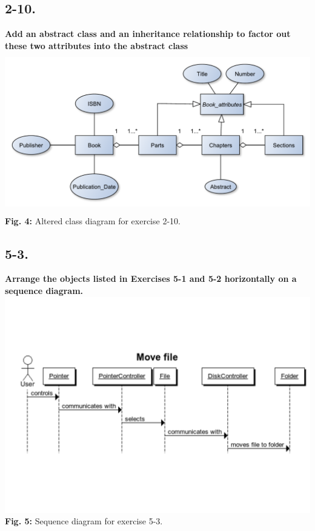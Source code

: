 \documentclass[12pt]{article}
\begin{document}
\subsection{2-10.}
\textbf{Add an abstract class and an inheritance relationship to factor out these two attributes into the abstract class}\\

\includegraphics[height=70mm]{2-10}\\
\textbf{Fig. 4:} Altered class diagram for exercise 2-10.



\newpage
\subsection{5-3.}
\textbf{Arrange the objects listed in Exercises 5-1 and 5-2 horizontally on a sequence diagram.}\\
\includegraphics[scale=0.5]{5-3}\\
\textbf{Fig. 5:} Sequence diagram for exercise 5-3.
\end{document}
